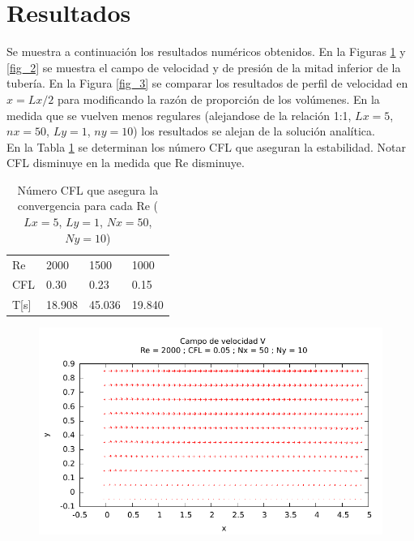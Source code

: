 \section{Resultados}

Se muestra a continuación los resultados numéricos obtenidos. En la Figuras \ref{fig_1} y \ref{fig_2} se muestra el campo de velocidad y de presión de la mitad inferior de la tubería.  En la Figura \ref{fig_3} se comparar los resultados de perfil de velocidad en $x=Lx/2$ para modificando la razón de proporción de los volúmenes. En la medida que se vuelven menos regulares (alejandose de la relación 1:1, $Lx=5$, $nx=50$, $Ly=1$, $ny=10$) los resultados se alejan de la solución analítica. \\

En la Tabla \ref{resultados_1} se determinan los número CFL que aseguran la estabilidad. Notar CFL disminuye en la medida que Re disminuye.

\begin{table}[H]
\centering
\begin{tabular}{|l|lll|} \hline
Re & 2000	& 1500	& 1000 \\
CFL & 0.30	& 0.23	& 0.15 \\
T[s] & 18.908	& 45.036 & 19.840 \\ \hline
\end{tabular}
\caption{Número CFL que asegura la convergencia para cada Re ($Lx=5$, $Ly=1$, $Nx=50$, $Ny=10$)} \label{resultados_1}
\end{table}


\begin{figure}[H]
\centering
\includegraphics[width=1\textwidth]{./fig1_1/fig1_1/velocity_field.pdf}
\caption{} \label{fig_1}
\end{figure}

